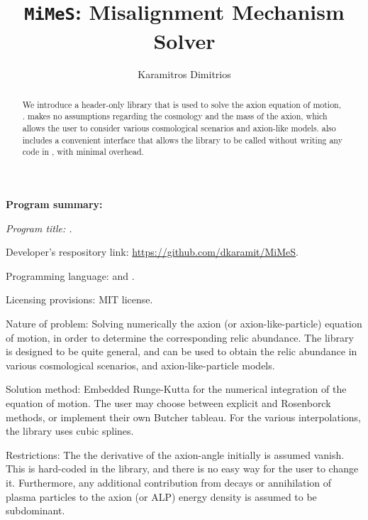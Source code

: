 \documentclass[11pt,a4paper]{article}
\author[ ]{Karamitros Dimitrios}
\affil[ ]{\em School of Physics and Astronomy, The University of Manchester,
	Manchester M13 9PL, United Kingdom}
\affil[ ]{\textit{E-mail: } \href{mailto:dimitrios.karamitros@manchester.ac.uk}{\color{blue}{dimitrios.karamitros@manchester.ac.uk}}}
\title{{\tt MiMeS}: Misalignment Mechanism Solver}
\begin{document}
\maketitle


\begin{abstract}
	We introduce a \CPP header-only library that is used to solve the axion equation of motion, \mimes.  
	\mimes makes no assumptions regarding the cosmology and the mass of the axion, which allows the user 
	to consider various cosmological scenarios and axion-like models.
	\mimes also includes a convenient \PY interface that allows the library to be called without writing any code in \CPP, with minimal overhead.
\end{abstract}

{\bf Program summary:}

{\sl 
	Program title: \mimes.
	
	Developer's respository link: \href{https://github.com/dkaramit/MiMeS}{https://github.com/dkaramit/MiMeS}.
	
	Programming language: \CPP and \PY.
	
	Licensing provisions: MIT license.
	
	Nature of problem: Solving numerically the axion (or axion-like-particle) equation of motion, in order to determine the corresponding relic abundance.  The library is designed to be quite general, 
	and can be used to obtain the relic abundance in various cosmological scenarios, and axion-like-particle models. 
	
	Solution method: Embedded Runge-Kutta for the numerical integration of the equation of motion. The user may choose between explicit and Rosenborck methods, or implement their own Butcher tableau. For the various interpolations, the library uses cubic splines. 
	
	Restrictions: The the derivative of the axion-angle initially is assumed vanish. This is hard-coded in the library, and there is no easy way for the user to change it. Furthermore, any additional contribution from decays or annihilation of plasma particles to the axion (or ALP) energy density is assumed to be subdominant.   
}

\tableofcontents
\end{document}
